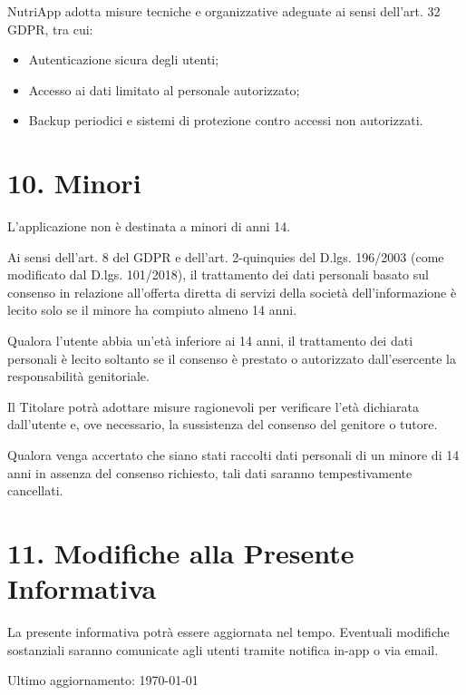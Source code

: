 \documentclass[a4paper,12pt]{article}
\begin{document}
    NutriApp adotta misure tecniche e organizzative adeguate ai sensi dell’art. 32 GDPR, tra cui:

    \begin{itemize}
        \item Autenticazione sicura degli utenti;
        \item Accesso ai dati limitato al personale autorizzato;
        \item Backup periodici e sistemi di protezione contro accessi non autorizzati.
    \end{itemize}

    \section*{10. Minori}

    L’applicazione non è destinata a minori di anni 14.

    Ai sensi dell’art. 8 del GDPR e dell’art. 2-quinquies del D.lgs. 196/2003 (come modificato dal D.lgs. 101/2018), il trattamento dei dati personali basato sul consenso in relazione all’offerta diretta di servizi della società dell’informazione è lecito solo se il minore ha compiuto almeno 14 anni.

    Qualora l’utente abbia un’età inferiore ai 14 anni, il trattamento dei dati personali è lecito soltanto se il consenso è prestato o autorizzato dall’esercente la responsabilità genitoriale.

    Il Titolare potrà adottare misure ragionevoli per verificare l’età dichiarata dall’utente e, ove necessario, la sussistenza del consenso del genitore o tutore.

    Qualora venga accertato che siano stati raccolti dati personali di un minore di 14 anni in assenza del consenso richiesto, tali dati saranno tempestivamente cancellati.

    \section*{11. Modifiche alla Presente Informativa}

    La presente informativa potrà essere aggiornata nel tempo.
    Eventuali modifiche sostanziali saranno comunicate agli utenti tramite notifica in-app o via email.

    \vspace{1cm}

    \noindent
    Ultimo aggiornamento: \today
\end{document}
